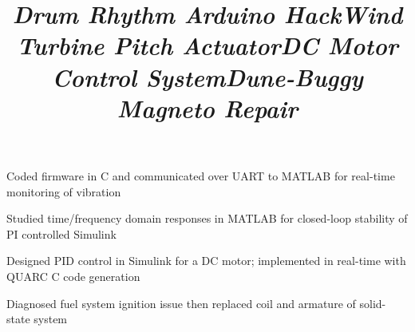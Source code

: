 \documentclass[mm]{res}
\begin{document}
\begin{resume}

\title{\textsl{Drum Rhythm Arduino Hack}}
\begin{position}
\tb Coded firmware in C and communicated over UART to MATLAB for real-time monitoring of vibration
\end{position}

\title{\textsl{Wind Turbine Pitch Actuator}}
\begin{position}
\tb Studied time/frequency domain responses in MATLAB for closed-loop stability of PI controlled Simulink
\end{position}


\title{\textsl{DC Motor Control System}}
\begin{position}
\tb Designed PID control in Simulink for a DC motor; implemented in real-time with QUARC C code generation
\end{position}


\title{\textsl{Dune-Buggy Magneto Repair}}
\begin{position}
\tb Diagnosed fuel system ignition issue then replaced coil and armature of solid-state system
\end{position}


\end{resume}
\end{document}
